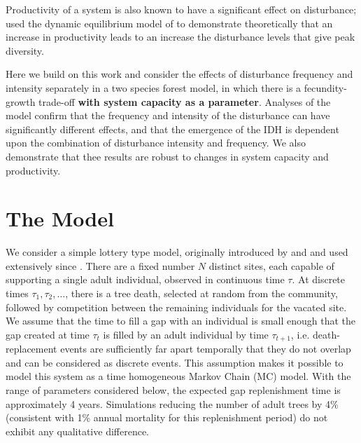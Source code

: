 Productivity of a system is also known to have a significant effect on disturbance; \cite{kondoh2001unifying} used the dynamic equilibrium model of \cite{huston1979general} to demonstrate theoretically that an increase in productivity leads to an increase the disturbance levels that give peak diversity.

Here we build on this work and consider the effects of disturbance frequency and intensity separately in a two species forest model, in which there is a fecundity-growth trade-off \textbf{with system capacity as a parameter}. Analyses of the model confirm that the frequency and intensity of the disturbance can have significantly different effects, and that the emergence of the IDH is dependent upon the combination of disturbance intensity and frequency. We also demonstrate that thee results are robust to changes in system capacity and productivity.

\section{The Model}
\label{model}
We consider a simple lottery type model, originally introduced by \cite{sale1978coexistence} and \cite{chesson1981environmental} and used extensively since \citep[e.g.][]{muko2000species,pacala1992herbivores}. There are a fixed number $N$ distinct sites, each capable of supporting a single adult individual, observed in continuous time $\tau$. At discrete times $\tau_1,\tau_2, \dots$, there is a tree death, selected at random from the community, followed by competition between the remaining individuals for the vacated site. We assume that the time to fill a gap with an individual is small enough that the gap created at time $\tau_t$ is filled by an adult individual by time $\tau_{t+1}$, i.e. death-replacement events are sufficiently far apart temporally that they do not overlap and can be considered as discrete events. This assumption makes it possible to model this system as a time homogeneous Markov Chain (MC) model. With the range of parameters considered below, the expected gap replenishment time is approximately 4 years. Simulations reducing the number of adult trees by 4\% (consistent with 1\% annual mortality for this replenishment period) do not exhibit any qualitative difference.

